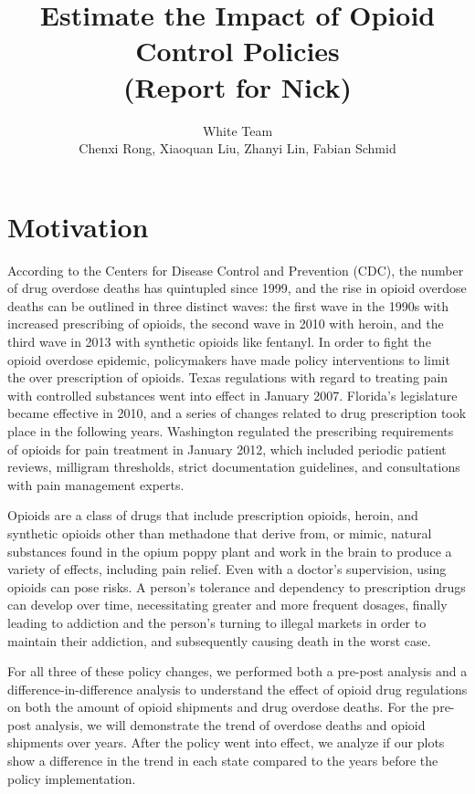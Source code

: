 \documentclass[12pt,letterpaper]{article}
\author{White Team \\ Chenxi Rong, Xiaoquan Liu, Zhanyi Lin, Fabian Schmid}
\title{Estimate the Impact of Opioid Control Policies \\ (Report for Nick)}
\begin{document}
\maketitle

\section{Motivation}

According to the Centers for Disease Control and Prevention (CDC), the number of drug overdose deaths has quintupled since 1999, and the rise in opioid overdose deaths can be outlined in three distinct waves: the first wave in the 1990s with increased prescribing of opioids, the second wave in 2010 with heroin, and the third wave in 2013 with synthetic opioids like fentanyl. In order to fight the opioid overdose epidemic, policymakers have made policy interventions to limit the over prescription of opioids. Texas regulations with regard to treating pain with controlled substances went into effect in January 2007. Florida’s legislature became effective in 2010, and a series of changes related to drug prescription took place in the following years. Washington regulated the prescribing requirements of opioids for pain treatment in January 2012, which included periodic patient reviews, milligram thresholds, strict documentation guidelines, and consultations with pain management experts.

Opioids are a class of drugs that include prescription opioids, heroin, and synthetic opioids other than methadone that derive from, or mimic, natural substances found in the opium poppy plant and work in the brain to produce a variety of effects, including pain relief. Even with a doctor's supervision, using opioids can pose risks. A person's tolerance and dependency to prescription drugs can develop over time, necessitating greater and more frequent dosages, finally leading to addiction and the person's turning to illegal markets in order to maintain their addiction, and subsequently causing death in the worst case.

For all three of these policy changes, we performed both a pre-post analysis and a difference-in-difference analysis to understand the effect of opioid drug regulations on both the amount of opioid shipments and drug overdose deaths. For the pre-post analysis, we will demonstrate the trend of overdose deaths and opioid shipments over years. After the policy went into effect, we analyze if our plots show a difference in the trend in each state compared to the years before the policy implementation.
\end{document}
